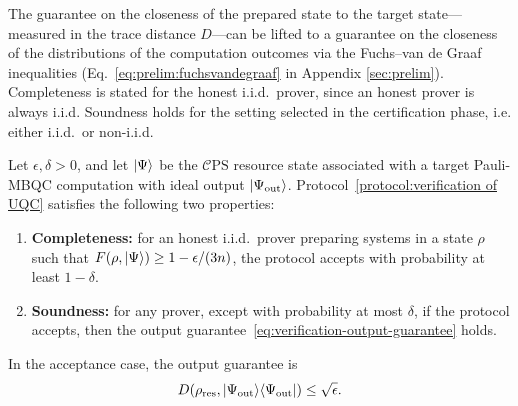 \documentclass[a4paper,twocolumn,11pt,unpublished]{quantumarticle}
\newcommand{\mCEPS}{\mathcal{C}\text{PS}}
\newcommand{\ketbra}[1]{\ket{#1}\!\bra{#1}}
\begin{document}
The guarantee on the closeness of the prepared state to the target state—measured in the trace distance $D$—can be lifted to a guarantee on the closeness of the distributions of the computation outcomes via the Fuchs--van de Graaf inequalities (Eq.~\eqref{eq:prelim:fuchsvandegraaf} in Appendix \ref{sec:prelim}).
Completeness is stated for the honest i.i.d.\ prover, since an honest prover is always i.i.d. Soundness holds for the setting selected in the certification phase, i.e. either i.i.d.\ or non-i.i.d.

\begin{theorem}
    Let $\epsilon,\delta>0$, and let $\ket{\Psi}$ be the $\mCEPS$ resource state associated with a target Pauli-MBQC computation with ideal output $\ket{\Psi_{\rm out}}$. Protocol~\ref{protocol:verification of UQC} satisfies the following two properties:
    \begin{enumerate}
        \item \textbf{Completeness:} for an honest i.i.d.\ prover preparing systems in a state $\rho$ such that $F(\rho,\ket{\Psi})\geq 1-\epsilon/(3n)$, the protocol accepts with probability at least $1-\delta$.

        \item \textbf{Soundness:} for any prover, except with probability at most $\delta$, if the protocol accepts, then the output guarantee~\eqref{eq:verification-output-guarantee} holds.
    \end{enumerate}
    In the acceptance case, the output guarantee is
    \begin{equation}
        \label{eq:verification-output-guarantee}
        D(\rho_{\mathrm{res}},\ketbra{\Psi_{\rm out}})\leq \sqrt{\epsilon}.
    \end{equation}
\end{theorem}
\end{document}
